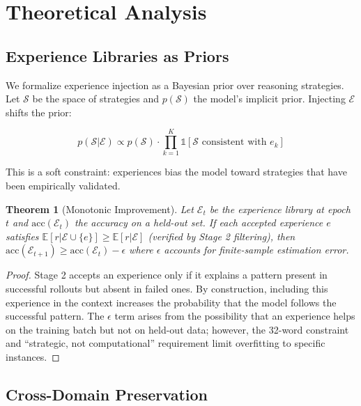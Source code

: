 \documentclass[11pt,letterpaper]{article}
\newtheorem{theorem}{Theorem}[section]
\begin{document}
\section{Theoretical Analysis}
\label{sec:theory}

\subsection{Experience Libraries as Priors}

We formalize experience injection as a Bayesian prior over reasoning strategies.  Let $\mathcal{S}$ be the space of strategies and $p(\mathcal{S})$ the model's implicit prior.  Injecting $\mathcal{E}$ shifts the prior:

\begin{equation}
    p(\mathcal{S} | \mathcal{E}) \propto p(\mathcal{S}) \cdot \prod_{k=1}^K \mathbb{1}[\mathcal{S} \text{ consistent with } e_k]
\end{equation}

This is a soft constraint: experiences bias the model toward strategies that have been empirically validated.

\begin{theorem}[Monotonic Improvement]
Let $\mathcal{E}_t$ be the experience library at epoch $t$ and $\text{acc}(\mathcal{E}_t)$ the accuracy on a held-out set.  If each accepted experience $e$ satisfies $\mathbb{E}[r | \mathcal{E} \cup \{e\}] \geq \mathbb{E}[r | \mathcal{E}]$ (verified by Stage 2 filtering), then $\text{acc}(\mathcal{E}_{t+1}) \geq \text{acc}(\mathcal{E}_t) - \epsilon$ where $\epsilon$ accounts for finite-sample estimation error.
\end{theorem}

\begin{proof}
Stage 2 accepts an experience only if it explains a pattern present in successful rollouts but absent in failed ones.  By construction, including this experience in the context increases the probability that the model follows the successful pattern.  The $\epsilon$ term arises from the possibility that an experience helps on the training batch but not on held-out data; however, the 32-word constraint and ``strategic, not computational'' requirement limit overfitting to specific instances.
\end{proof}

\subsection{Cross-Domain Preservation}
\end{document}
